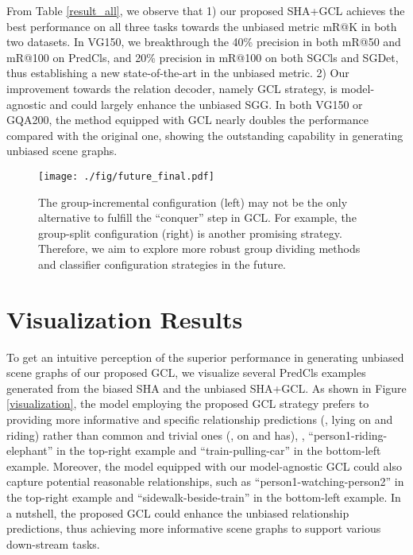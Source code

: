 \documentclass[10pt,twocolumn,letterpaper]{article}
\begin{document}
{From Table \ref{result_all}, we observe that 1) our proposed SHA+GCL achieves the best performance on all three tasks towards the unbiased metric mR@K in both two datasets. In VG150, we breakthrough the 40\% precision in both mR@50 and mR@100 on PredCls, and 20\% precision in mR@100 on both SGCls and SGDet, thus establishing a new state-of-the-art in the unbiased metric. 2) Our improvement towards the relation decoder, namely GCL strategy, is model-agnostic and could largely enhance the unbiased SGG. In both VG150 or GQA200, the method equipped with GCL nearly doubles the performance compared with the original one, showing the outstanding capability in generating unbiased scene graphs.

\begin{figure}[t]
	\centering
	\texttt{[image: ./fig/future\_final.pdf]}
	\vspace{-0.4cm}
	\caption{The group-incremental configuration (left) may not be the only alternative to fulfill the ``conquer'' step in GCL. For example, the group-split configuration (right) is another promising strategy. Therefore, we aim to explore more robust group dividing methods and classifier configuration strategies in the future.}
	\vspace{-0.4cm}
	\label{future_work}
\end{figure}

\section{Visualization Results}
To get an intuitive perception of the superior performance in generating unbiased scene graphs of our proposed GCL, we visualize several PredCls examples generated from the biased SHA and the unbiased SHA+GCL. As shown in Figure \ref{visualization}, the model employing the proposed GCL strategy prefers to providing more informative and specific relationship predictions (\eg, lying on and riding) rather than common and trivial ones (\eg, on and has), \eg, ``person1-riding-elephant'' in the top-right example and ``train-pulling-car'' in the bottom-left example. Moreover, the model equipped with our model-agnostic GCL could also capture potential reasonable relationships, such as ``person1-watching-person2'' in the top-right example and ``sidewalk-beside-train'' in the bottom-left example. In a nutshell, the proposed GCL could enhance the unbiased relationship predictions, thus achieving more informative scene graphs to support various down-stream tasks.

}
\end{document}
